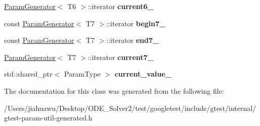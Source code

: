 \begin{DoxyCompactItemize}
\mbox{\hyperlink{classtesting_1_1internal_1_1_param_generator}{Param\+Generator}}$<$ T6 $>$\+::iterator {\bfseries current6\+\_\+}
\item 
\mbox{\label{classtesting_1_1internal_1_1_cartesian_product_generator7_1_1_iterator_ab8452741b3eaea0ca77da1c41abf23c7}} 
const \mbox{\hyperlink{classtesting_1_1internal_1_1_param_generator}{Param\+Generator}}$<$ T7 $>$\+::iterator {\bfseries begin7\+\_\+}
\item 
\mbox{\label{classtesting_1_1internal_1_1_cartesian_product_generator7_1_1_iterator_a492da2896bf2527e4c0347db3f8cca91}} 
const \mbox{\hyperlink{classtesting_1_1internal_1_1_param_generator}{Param\+Generator}}$<$ T7 $>$\+::iterator {\bfseries end7\+\_\+}
\item 
\mbox{\label{classtesting_1_1internal_1_1_cartesian_product_generator7_1_1_iterator_a44ee2e3882390471e5d064e9280d3b47}} 
\mbox{\hyperlink{classtesting_1_1internal_1_1_param_generator}{Param\+Generator}}$<$ T7 $>$\+::iterator {\bfseries current7\+\_\+}
\item 
\mbox{\label{classtesting_1_1internal_1_1_cartesian_product_generator7_1_1_iterator_a3df4defc9419774757e1cef7e93bc870}} 
std\+::shared\+\_\+ptr$<$ Param\+Type $>$ {\bfseries current\+\_\+value\+\_\+}
\end{DoxyCompactItemize}


The documentation for this class was generated from the following file\+:\begin{DoxyCompactItemize}
\item 
/\+Users/jiahuawu/\+Desktop/\+O\+D\+E\+\_\+\+Solver2/test/googletest/include/gtest/internal/gtest-\/param-\/util-\/generated.\+h\end{DoxyCompactItemize}
